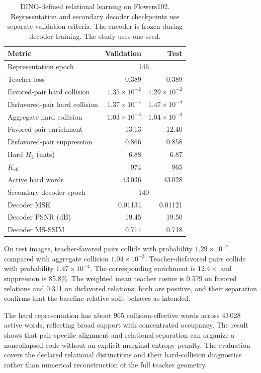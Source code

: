 \begin{table}[t]
\centering\small
\begin{tabular}{lrr}
\toprule
Metric & Validation & Test \\
\midrule
Representation epoch & \multicolumn{2}{c}{146} \\
Teacher loss & 0.389 & 0.389 \\
Favored-pair hard collision & $1.35\times10^{-2}$ & $1.29\times10^{-2}$ \\
Disfavored-pair hard collision & $1.37\times10^{-4}$ & $1.47\times10^{-4}$ \\
Aggregate hard collision & $1.03\times10^{-3}$ & $1.04\times10^{-3}$ \\
Favored-pair enrichment & 13.13 & 12.40 \\
Disfavored-pair suppression & 0.866 & 0.858 \\
Hard $H_2$ (nats) & 6.88 & 6.87 \\
$K_{\mathrm{eff}}$ & 974 & 965 \\
Active hard words & 43\,036 & 43\,028 \\
\midrule
Secondary decoder epoch & \multicolumn{2}{c}{140} \\
Decoder MSE & 0.01134 & 0.01121 \\
Decoder PSNR (dB) & 19.45 & 19.50 \\
Decoder MS-SSIM & 0.714 & 0.718 \\
\bottomrule
\end{tabular}
\caption{DINO-defined relational learning on Flowers102. Representation and secondary decoder checkpoints use separate validation criteria. The encoder is frozen during decoder training. The study uses one seed.}
\label{tab:flowers102-teacher-results}
\end{table}

On test images, teacher-favored pairs collide with probability $1.29\times10^{-2}$, compared with aggregate collision $1.04\times10^{-3}$.
Teacher-disfavored pairs collide with probability $1.47\times10^{-4}$.
The corresponding enrichment is $12.4\times$ and suppression is 85.8\%.
The weighted mean teacher cosine is 0.579 on favored relations and 0.311 on disfavored relations; both are positive, and their separation confirms that the baseline-relative split behaves as intended.

The hard representation has about 965 collision-effective words across 43\,028 active words, reflecting broad support with concentrated occupancy.
The result shows that pair-specific alignment and relational separation can organize a noncollapsed code without an explicit marginal entropy penalty.
The evaluation covers the declared relational distinctions and their hard-collision diagnostics rather than numerical reconstruction of the full teacher geometry.

